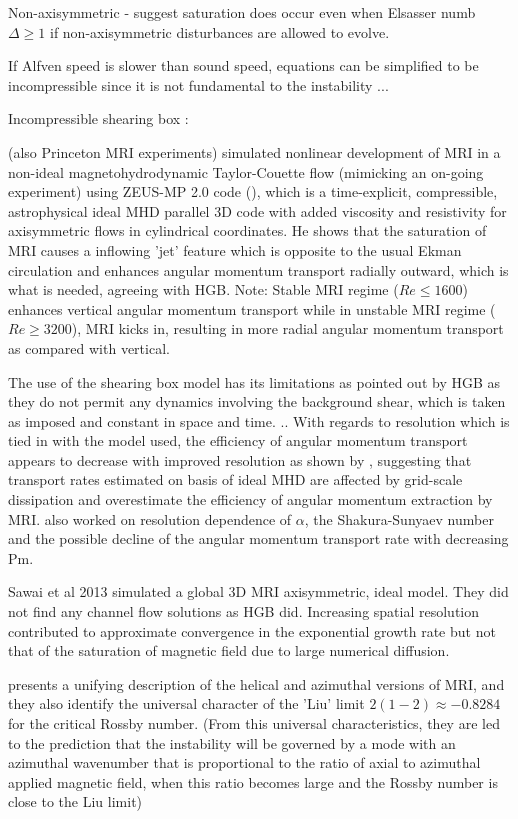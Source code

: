 \documentclass{jfm}
\begin{document}
Non-axisymmetric \cite{Fleming2000} - suggest saturation does occur even when Elsasser numb $\Delta \ge 1$ if non-axisymmetric disturbances are allowed to evolve.

If Alfven speed is slower than sound speed, equations can be simplified to be incompressible since it is not fundamental to the instability \cite{Balbus1991} ...

Incompressible shearing box : \cite{Lesur2007}

\cite{Liu2008} (also Princeton MRI experiments) simulated nonlinear development of MRI in a non-ideal magnetohydrodynamic Taylor-Couette flow (mimicking an on-going experiment) using ZEUS-MP 2.0 code (\cite{Hayes2006}), which is a time-explicit, compressible, astrophysical ideal MHD parallel 3D code with added viscosity and resistivity for axisymmetric flows in cylindrical coordinates. He shows that the saturation of MRI causes a inflowing 'jet' feature which is opposite to the usual Ekman circulation and enhances angular momentum transport radially outward, which is what is needed, agreeing with HGB. Note: Stable MRI regime ($ Re \le 1600$) enhances vertical angular momentum transport while in unstable MRI regime ($Re \ge 3200$), MRI kicks in, resulting in more radial angular momentum transport as compared with vertical.

The use of the shearing box model has its limitations as pointed out by HGB as they do not permit any dynamics involving the background shear, which is taken as imposed and constant in space and time. \cite{Regev2008}.. With regards to resolution which is tied in with the model used, the efficiency of angular momentum transport appears to decrease with improved resolution as shown by \cite{Fomang2007}, suggesting that transport rates estimated on basis of ideal MHD are affected by grid-scale dissipation and overestimate the efficiency of angular momentum extraction by MRI. \cite{Kapyla2008} also worked on resolution dependence of $\alpha$, the Shakura-Sunyaev number and the possible decline of the angular momentum transport rate with decreasing Pm.

Sawai et al 2013 \cite{Sawai2013} simulated a global 3D MRI axisymmetric, ideal model. They did not find any channel flow solutions as HGB did. Increasing spatial resolution contributed to approximate convergence in the exponential growth rate but not that of the saturation of magnetic field due to large numerical diffusion.

\cite{Kirillov2012} presents a unifying description of the helical and azimuthal versions of MRI, and they also identify the universal character of the 'Liu' limit $2(1 - 2) \approx - 0.8284$ for the critical Rossby number. (From this universal characteristics, they are led to the prediction that the instability will be governed by a mode with an azimuthal wavenumber that is proportional to the ratio of axial to azimuthal applied magnetic field, when this ratio becomes large and the Rossby number is close to the Liu limit)
\end{document}
